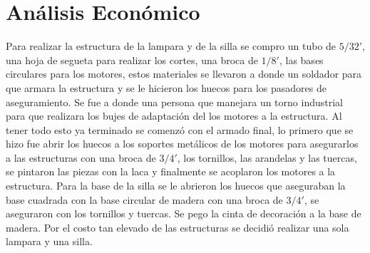 \documentclass[twocolumn]{IEEEtran}
\begin{document}
\section{Análisis Económico}
\noindent
Para realizar la estructura de la lampara y de la silla se compro un tubo de $5/32'$, una hoja de segueta para realizar los cortes, una broca de $1/8'$, las bases circulares para los motores, estos materiales se llevaron a donde un soldador para que armara la estructura y se le hicieron los huecos para los pasadores de aseguramiento. Se fue a donde una persona que manejara un torno industrial para que realizara los bujes de adaptación del los motores a la estructura. Al tener todo esto ya terminado se comenzó con el armado final, lo primero que se hizo fue abrir los huecos a los soportes metálicos de los motores para asegurarlos a las estructuras con una broca de $3/4'$, los tornillos, las arandelas y las tuercas, se pintaron las piezas con la laca y finalmente se acoplaron los motores a la estructura. Para la base de la silla se le abrieron los huecos que aseguraban la base cuadrada con la base circular de madera con una broca de $3/4'$, se aseguraron con los tornillos y tuercas. Se pego la cinta de decoración a la base de madera. Por el costo  tan elevado de las estructuras se decidió realizar una sola lampara y una silla.
\end{document}
